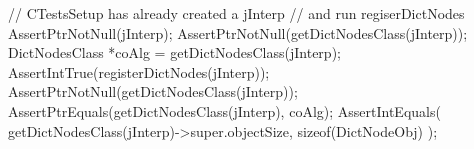 
\startCTest
  // CTestsSetup has already created a jInterp
  // and run regiserDictNodes
  AssertPtrNotNull(jInterp);
  AssertPtrNotNull(getDictNodesClass(jInterp));
  DictNodesClass *coAlg =
    getDictNodesClass(jInterp);
  AssertIntTrue(registerDictNodes(jInterp));
  AssertPtrNotNull(getDictNodesClass(jInterp));
  AssertPtrEquals(getDictNodesClass(jInterp), coAlg);
  AssertIntEquals(
    getDictNodesClass(jInterp)->super.objectSize, 
    sizeof(DictNodeObj)
  );
\stopCTest
\stopTestCase
\stopTestSuite


